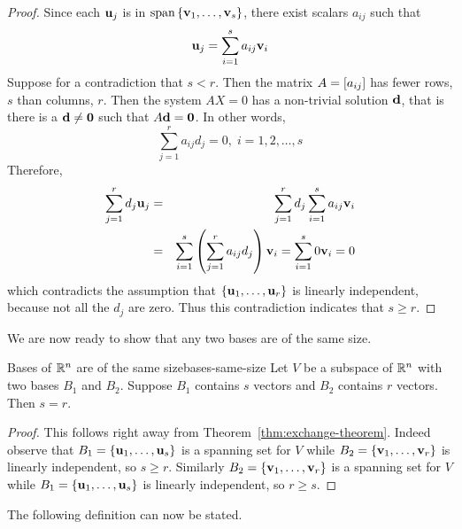 \begin{proof}
  Since each $\mbox{\bf u}_j$ is in
  $\sspan\set{\vect{v}_{1},\ldots ,\vect{v}_{s}} $, there exist
  scalars $a_{ij}$ such that
  \begin{equation*}
    \mbox{\bf u}_{j}=\sum_{i=1}^{s}a_{ij}\mbox{\bf v}_{i}
  \end{equation*}
  Suppose for a contradiction that $s<r$. Then the matrix
  $A = \left[ a_{ij} \right]$ has fewer rows, $s$ than columns, $r$. Then the
  system $AX=0$ has %
  a non-trivial solution $\mbox{\bf d}$, that is there is a
  $\mbox{\bf d}\neq \mbox{\bf 0}$ such that $A\mbox{\bf d}=\mbox{\bf 0}$. In other
  words,
  \begin{equation*}
    \sum_{j=1}^{r}a_{ij}d_{j}=0,\;i=1,2,\ldots ,s
  \end{equation*}
  Therefore, 
  \begin{eqnarray*}
    \sum_{j=1}^{r}d_{j}\mbox{\bf u}_{j}
    &=&\sum_{j=1}^{r}d_{j}\sum_{i=1}^{s}a_{ij}
        \mbox{\bf v}_{i} \\
    &=&\sum_{i=1}^{s}\left(\sum_{j=1}^{r}a_{ij}d_{j}\right) \mbox{\bf v}
        _{i}=\sum_{i=1}^{s}0\mbox{\bf v}_{i}=0
  \end{eqnarray*}
  which contradicts the assumption that
  $\left\{\mbox{\bf u}_{1},\ldots ,\mbox{\bf u}_{r}\right\} $ is linearly independent,
  because not all the $d_{j}$ are zero. Thus this contradiction
  indicates that $s\geq r$.
\end{proof}

We are now ready to show that any two bases are of the same size.

\begin{theorem}{Bases of $\mathbb{R}^{n}$ are of the same size}{bases-same-size}
  Let $V$ be a subspace of $\mathbb{R}^{n}$ with two bases $B_1$ and
  $B_2$. Suppose $B_1$ contains $s$ vectors and $B_2$ contains $r$
  vectors. Then $s=r$.
\end{theorem}

\begin{proof}
  This follows right away from
  Theorem~\ref{thm:exchange-theorem}. Indeed observe that
  $B_1 = \left\{ \mbox{\bf u}_{1},\ldots ,\mbox{\bf u}_{s}\right\} $ is a spanning set
  for $V$ while $ B_2 = \left\{\mbox{\bf v}_{1},\ldots ,\mbox{\bf v}_{r}\right\} $ is
  linearly independent, so $s \geq r$. Similarly
  $B_2 = \left\{\mbox{\bf v}_{1},\ldots ,\mbox{\bf v} _{r}\right\} $ is a spanning set
  for $V$ while $B_1 = \left\{\mbox{\bf u}_{1},\ldots , \mbox{\bf u}_{s}\right\} $ is
  linearly independent, so $r\geq s$.
\end{proof}

The following definition can now be stated.

